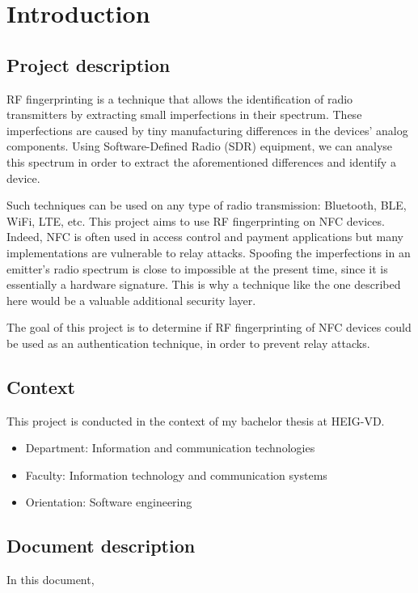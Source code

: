 \section{Introduction}

\subsection{Project description}
RF fingerprinting is a technique that allows the identification of radio transmitters by extracting small imperfections in their spectrum. These imperfections are caused by tiny manufacturing differences in the devices' analog components. Using Software-Defined Radio (SDR) equipment, we can analyse this spectrum in order to extract the aforementioned differences and identify a device.

Such techniques can be used on any type of radio transmission: Bluetooth, BLE, WiFi, LTE, etc. This project aims to use RF fingerprinting on NFC devices. Indeed, NFC is often used in access control and payment applications but many implementations are vulnerable to relay attacks. Spoofing the imperfections in an emitter's radio spectrum is close to impossible at the present time, since it is essentially a hardware signature. This is why a technique like the one described here would be a valuable additional security layer.

The goal of this project is to determine if RF fingerprinting of NFC devices could be used as an authentication technique, in order to prevent relay attacks.

\subsection{Context}
This project is conducted in the context of my bachelor thesis at HEIG-VD.

\begin{itemize}
  \item Department: Information and communication technologies
  \item Faculty: Information technology and communication systems
  \item Orientation: Software engineering
\end{itemize}

\subsection{Document description}
In this document,

